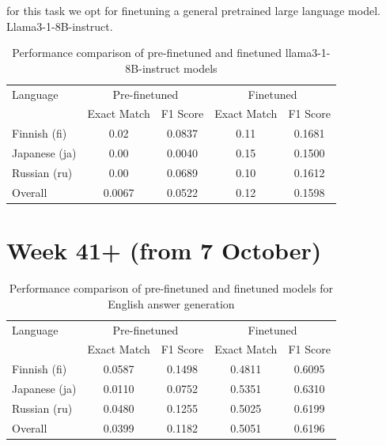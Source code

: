 \documentclass[11pt]{article}
\begin{document}
for this task we opt for finetuning a general pretrained large language model. Llama3-1-8B-instruct.



\begin{table}[ht]
    \centering
    \begin{tabular}{|l|c|c|c|c|}
        \hline
        Language & \multicolumn{2}{c|}{Pre-finetuned} & \multicolumn{2}{c|}{Finetuned} \\
        \cline{2-5}
        & Exact Match & F1 Score & Exact Match & F1 Score \\
        \hline
        Finnish (fi) & 0.02 & 0.0837 & 0.11 & 0.1681 \\
        Japanese (ja) & 0.00 & 0.0040 & 0.15 & 0.1500 \\
        Russian (ru) & 0.00 & 0.0689 & 0.10 & 0.1612 \\
        \hline
        Overall & 0.0067 & 0.0522 & 0.12 & 0.1598 \\
        \hline
    \end{tabular}
    \caption{Performance comparison of pre-finetuned and finetuned llama3-1-8B-instruct models}
    \label{tab:llama3_performance_comparison}
\end{table}

\section{Week 41+ (from 7 October)}

\begin{table}[ht]
    \centering
    \begin{tabular}{|l|c|c|c|c|}
        \hline
        Language & \multicolumn{2}{c|}{Pre-finetuned} & \multicolumn{2}{c|}{Finetuned} \\
        \cline{2-5}
        & Exact Match & F1 Score & Exact Match & F1 Score \\
        \hline
        Finnish (fi) & 0.0587 & 0.1498 & 0.4811 & 0.6095 \\
        Japanese (ja) & 0.0110 & 0.0752 & 0.5351 & 0.6310 \\
        Russian (ru) & 0.0480 & 0.1255 & 0.5025 & 0.6199 \\
        \hline
        Overall & 0.0399 & 0.1182 & 0.5051 & 0.6196 \\
        \hline
    \end{tabular}
    \caption{Performance comparison of pre-finetuned and finetuned models for English answer generation}
    \label{tab:week41_performance_comparison}
\end{table}
\end{document}
